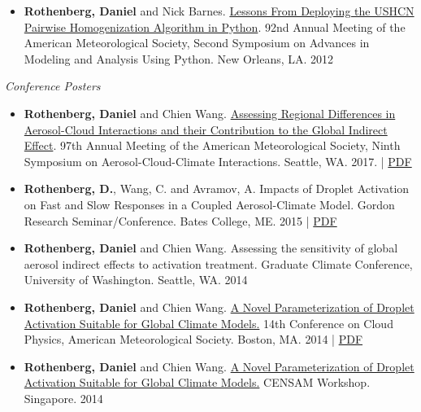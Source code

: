\documentclass[11pt,letterpaper]{article}
\begin{document}
\begin{itemize}[itemindent=-10pt]
 \item \textbf{Rothenberg, Daniel} and Nick Barnes. \href{https://ams.confex.com/ams/92Annual/webprogram/Paper198219.html}{Lessons From Deploying the USHCN Pairwise Homogenization Algorithm in Python}. 92nd Annual Meeting of the American Meteorological Society, Second Symposium on Advances in Modeling and Analysis Using Python. New Orleans, LA. 2012
\end{itemize}

\bigskip
\emph{Conference Posters}
\medskip
\begin{itemize}[itemindent=-10pt]

 \item \textbf{Rothenberg, Daniel} and Chien Wang. \href{https://app.core-apps.com/ams2017/abstract/15b6ce6f2a9ba4be8e489d83ea69e909}{Assessing Regional Differences in Aerosol-Cloud Interactions and their Contribution to the Global Indirect Effect}. 97th Annual Meeting of the American Meteorological Society, Ninth Symposium on Aerosol-Cloud-Climate Interactions. Seattle, WA. 2017. | \href{https://figshare.com/s/f7bef67cb5d120e17a96}{PDF}

 \item \textbf{Rothenberg, D.}, Wang, C. and Avramov, A. Impacts of Droplet Activation on Fast and Slow Responses in a Coupled Aerosol-Climate Model. Gordon Research Seminar/Conference. Bates College, ME. 2015 | \href{http://figshare.com/articles/poster_pdf/1534717}{PDF}

 \item \textbf{Rothenberg, Daniel} and Chien Wang. Assessing the sensitivity of global aerosol indirect effects to activation treatment. Graduate Climate Conference, University of Washington. Seattle, WA. 2014

 \item \textbf{Rothenberg, Daniel} and Chien Wang. \href{https://ams.confex.com/ams/14CLOUD14ATRAD/webprogram/Paper250349.html}{A Novel Parameterization of Droplet Activation Suitable for Global Climate Models.} 14th Conference on Cloud Physics, American Meteorological Society. Boston, MA. 2014 |  \href{http://figshare.com/articles/A_Novel_Parameterization_of_Droplet_Activation_Suitable_for_Global_Climate_Models/1085984}{PDF}

 \item \textbf{Rothenberg, Daniel} and Chien Wang. \href{http://figshare.com/articles/A_Novel_Parameterization_of_Droplet_Activation_Suitable_for_Global_Climate_Models/1085984}{A Novel Parameterization of Droplet Activation Suitable for Global Climate Models.} CENSAM Workshop. Singapore. 2014


\end{itemize}
\end{document}
